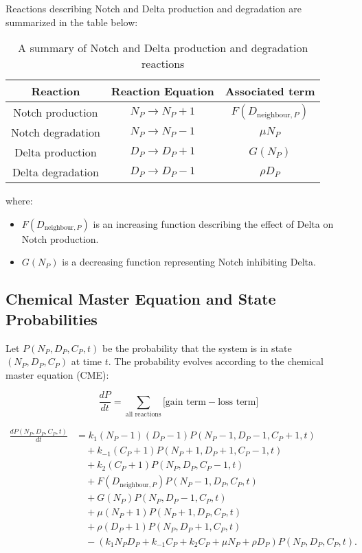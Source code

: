 \documentclass{article}
\begin{document}
Reactions describing Notch and Delta production and degradation  are summarized in the table below:

\begin{table}[H]
    \centering
    \begin{tabular}{|c|c|c|} \hline 
         Reaction&  Reaction Equation& Associated term\\ \hline 
         Notch production&  \( N_P \to N_P + 1 \)& \( F(D_{\text{neighbour},P}) \)\\ \hline 
         Notch degradation&  \( N_P \to N_P - 1 \)& \( \mu N_P \)\\ \hline 
         Delta production&  \( D_P \to D_P + 1 \)& \( G(N_P) \)\\ \hline 
         Delta degradation&  \( D_P \to D_P - 1 \)& \( \rho D_P \)\\\hline
    \end{tabular}
    \caption{A summary of Notch and Delta production and degradation reactions}
    \label{1}
    
\end{table}

where:
\begin{itemize}
    \item \( F(D_{\text{neighbour},P}) \) is an increasing function describing the effect of Delta on Notch production.
    \item \( G(N_P) \) is a decreasing function representing Notch inhibiting Delta.
\end{itemize}

\subsection{Chemical Master Equation and State Probabilities}
Let \( P(N_P, D_P, C_P, t) \) be the probability that the system is in state \( (N_P, D_P, C_P) \) at time \( t \). The probability evolves according to the chemical master equation (CME):

\[
\frac{dP}{dt} = \sum_{\text{all reactions}} \Big[ \text{gain term} - \text{loss term} \Big]
\]

\begin{align*}
  \frac{dP(N_P, D_P, C_P, t)}{dt} &= k_1 (N_P - 1)(D_P - 1) P(N_P - 1, D_P - 1, C_P + 1, t) \\
  &\quad + k_{-1} (C_P + 1) P(N_P + 1, D_P + 1, C_P - 1, t) \\
  &\quad + k_2 (C_P + 1) P(N_P, D_P, C_P - 1, t) \\
  &\quad + F(D_{\text{neighbour},P}) P(N_P - 1, D_P, C_P, t) \\
  &\quad + G(N_P) P(N_P, D_P - 1, C_P, t) \\
  &\quad + \mu (N_P + 1) P(N_P + 1, D_P, C_P, t) \\
  &\quad + \rho (D_P + 1) P(N_P, D_P + 1, C_P, t) \\
  &\quad - (k_1 N_P D_P + k_{-1} C_P + k_2 C_P + \mu N_P + \rho D_P) P(N_P, D_P, C_P, t).
\end{align*}
\end{document}
